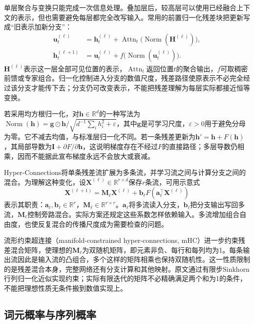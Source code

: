 单层聚合与变换只能完成一次信息处理。叠加层后，较高层可以使用已经融合上下文的表示，但也需要避免每层都完全改写输入。常用的前置归一化残差块把更新写成“旧表示加新分支”：
\begin{align}
 \bm u_t^{(\ell)}&=\bm h_t^{(\ell)}+
  \operatorname{Attn}_t\bigl(\operatorname{Norm}(\bm H^{(\ell)})\bigr),
 \label{eq:nlp-llm-layer-attention}\\
 \bm h_t^{(\ell+1)}&=\bm u_t^{(\ell)}+
  f\bigl(\operatorname{Norm}(\bm u_t^{(\ell)})\bigr).
 \label{eq:nlp-llm-layer-ffn}
\end{align}
$\bm H^{(\ell)}$表示这一层全部可见位置的表示，$\operatorname{Attn}_t$返回位置$t$的聚合输出，$f$可取稠密前馈或专家组合。归一化控制进入分支的数值尺度，残差路径使原表示不必完全经过该分支才能传下去；分支仍可改变表示，不能把残差理解为每层实际都接近恒等变换。

若采用均方根归一化，对$\bm h\in\mathbb R^d$的一种写法为$\operatorname{Norm}(\bm h)=\bm g\odot\bm h/\sqrt{d^{-1}\sum_i h_i^2+\varepsilon}$，其中$\bm g$是可学习尺度，$\varepsilon>0$用于避免分母为零。它不减去均值，与标准层归一化不同。若一条残差更新为$\bm h'=\bm h+F(\bm h)$，其局部导数为$\bm I+\partial F/\partial\bm h$，这说明梯度存在不经过$F$的直接路径；多层导数仍相乘，因而不能据此宣布梯度永远不会放大或衰减。

Hyper-Connections将单条残差流扩展为多条流，并学习流之间与计算分支之间的混合。为理解这种变化，设$\bm X^{(\ell)}\in\mathbb R^{r\times d}$保存$r$条流，可用示意式
\begin{equation}
 \bm X^{(\ell+1)}=
 \bm M_\ell\bm X^{(\ell)}+
 \bm b_\ell F(\bm a_\ell^{\top}\bm X^{(\ell)})
 \label{eq:nlp-llm-hyperconnection}
\end{equation}
表示其职责：$\bm a_\ell,\bm b_\ell\in\mathbb R^r$，$\bm M_\ell\in\mathbb R^{r\times r}$。$\bm a_\ell$将多流读入分支，$\bm b_\ell$把分支输出写回多流，$\bm M_\ell$控制旁路混合。实际方案还规定这些系数怎样依赖输入。多流增加组合自由度，也使反复混合的传播尺度成为需要检查的问题。

流形约束超连接（manifold-constrained hyper-connections, mHC）进一步约束残差混合矩阵，使理想的$\bm M_\ell$为双随机矩阵，即元素非负、每行和每列均为1。每条输出流因此是输入流的凸组合，多个这样的矩阵相乘也保持双随机性。这一性质限制的是残差混合本身，完整网络还有分支计算和其他映射。原文通过有限步Sinkhorn行列归一化近似实现约束；实际有限迭代的矩阵不必精确满足两个和为1的条件，不能把理想性质无条件搬到数值实现上。

\subsection{词元概率与序列概率}
\label{sec:nlp-llm-probabilities}

